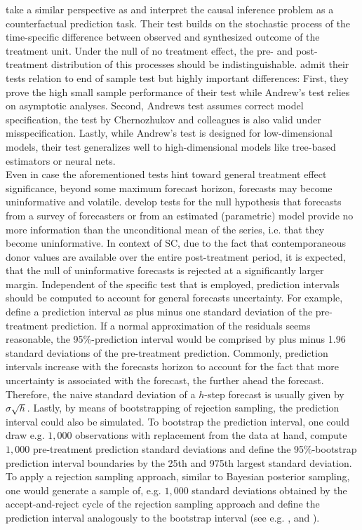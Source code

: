 \cite{chernozhukov:2021} take a similar perspective as \cite{andrews:2003} and interpret the causal inference problem as a counterfactual prediction task. Their test builds on the stochastic process of the time-specific difference between observed and synthesized outcome of the treatment unit. Under the null of no treatment effect, the pre- and post-treatment distribution of this processes should be indistinguishable. \cite{chernozhukov:2021} admit their tests relation to \cite{andrews:2003} end of sample test but highly important differences: First, they prove the high small sample performance of their test while Andrew's test relies on asymptotic analyses. Second, Andrews test assumes correct model specification, the test by Chernozhukov and colleagues is also valid under misspecification. Lastly, while Andrew's test is designed for low-dimensional models, their test generalizes well to high-dimensional models like tree-based estimators or neural nets. \\
Even in case the aforementioned tests hint toward general treatment effect significance, beyond some maximum forecast horizon, forecasts may become uninformative and volatile. \cite{breitung:2021} develop tests for the null hypothesis that forecasts from a survey of forecasters or from an estimated (parametric) model provide no more information than the unconditional mean of the series, i.e. that they become uninformative. In context of \ac{SC}, due to the fact that contemporaneous donor values are available over the entire post-treatment period, it is expected, that the null of uninformative forecasts is rejected at a significantly larger margin.
Independent of the specific test that is employed, prediction intervals should be computed to account for general forecasts uncertainty. For example, \cite{born:2019} define a prediction interval as plus minus one standard deviation of the pre-treatment prediction. If a normal approximation of the residuals seems reasonable, the 95\%-prediction interval would be comprised by plus minus 1.96 standard deviations of the pre-treatment prediction. Commonly, prediction intervals increase with the forecasts horizon to account for the fact that more uncertainty is associated with the forecast, the further ahead the forecast. Therefore, the naive standard deviation of a $h$-step forecast is usually given by $\hat{\sigma} \sqrt{h}$. Lastly, by means of bootstrapping of rejection sampling, the prediction interval could also be simulated. To bootstrap the prediction interval, one could draw e.g. $1,000$ observations with replacement from the data at hand, compute $1,000$ pre-treatment prediction standard deviations and define the 95\%-bootstrap prediction interval boundaries by the 25th and 975th largest standard deviation. To apply a rejection sampling approach, similar to Bayesian posterior sampling, one would generate a sample of, e.g. $1,000$ standard deviations obtained by the accept-and-reject cycle of the rejection sampling approach and define the prediction interval analogously to the bootstrap interval (see e.g. \cite{diebold:2017}, \cite{gebhard:2012} and \cite{koop:2003}).










